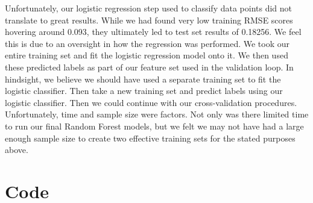 \documentclass[11pt, oneside]{article}   	%
\begin{document}
Unfortunately, our logistic regression step used to classify data points did not translate to great results. While we had found very low training RMSE scores hovering around 0.093, they ultimately led to test set results of 0.18256. We feel this is due to an oversight in how the regression was performed. We took our entire training set and fit the logistic regression model onto it. We then used these predicted labels as part of our feature set used in the validation loop. In hindsight, we believe we should have used a separate training set to fit the logistic classifier. Then take a new training set and predict labels using our logistic classifier. Then we could continue with our cross-validation procedures. Unfortunately, time and sample size were factors. Not only was there limited time to run our final Random Forest models, but we felt we may not have had a large enough sample size to create two effective training sets for the stated purposes above.

\newpage
\section{Code}

 
 
\end{document}

